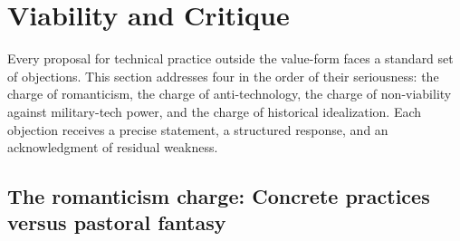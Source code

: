 \section{Viability and Critique}

Every proposal for technical practice outside the value-form faces a standard set of objections. This section addresses four in the order of their seriousness: the charge of romanticism, the charge of anti-technology, the charge of non-viability against military-tech power, and the charge of historical idealization. Each objection receives a precise statement, a structured response, and an acknowledgment of residual weakness.

\subsection{The romanticism charge: Concrete practices versus pastoral fantasy}

